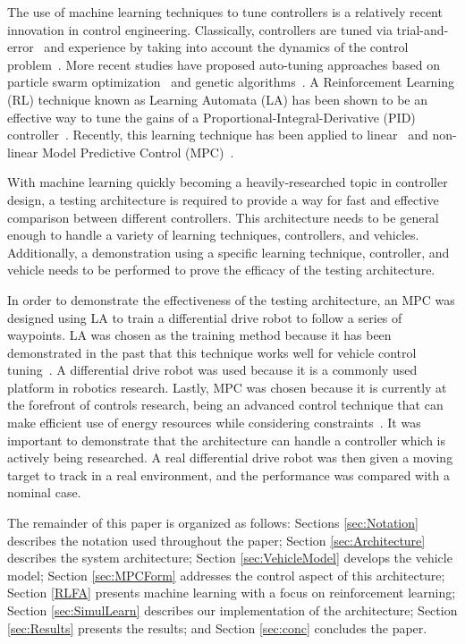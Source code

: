 \documentclass[conference]{IEEEtran}
\begin{document}
The use of machine learning techniques to tune controllers is a relatively recent innovation in control engineering. Classically, controllers are tuned via trial-and-error~\cite{Suicmez-2014} and experience by taking into account the dynamics of the control problem~\cite{Camacho:1999}. More recent studies have proposed auto-tuning approaches based on particle swarm optimization~\cite{han:2006,suzuki:2007} and genetic algorithms~\cite{vanderlee:2008}. A Reinforcement Learning (RL) technique known as Learning Automata (LA) has been shown to be an effective way to tune the gains of a Proportional-Integral-Derivative (PID) controller~\cite{Barros-2015}. Recently, this learning technique has been applied to linear~\cite{JardineSys-2017,jardine:2017:IFAC} and non-linear Model Predictive Control (MPC)~\cite{cabral:2017}. 

With machine learning quickly becoming a heavily-researched topic in controller design, a testing architecture is required to provide a way for fast and effective comparison between different controllers. This architecture needs to be general enough to handle a variety of learning techniques, controllers, and vehicles. Additionally, a demonstration using a specific learning technique, controller, and vehicle needs to be performed to prove the efficacy of the testing architecture. 

In order to demonstrate the effectiveness of the testing architecture, an MPC was designed using LA to train a differential drive robot to follow a series of waypoints. LA was chosen as the training method because it has been demonstrated in the past that this technique works well for vehicle control tuning~\cite{Barros-2015,JardineSys-2017,jardine:2017:IFAC,cabral:2017}. A differential drive robot was used because it is a commonly used platform in robotics research. Lastly, MPC was chosen because it is currently at the forefront of controls research, being an advanced control technique that can make efficient use of energy resources while considering constraints~\cite{Mooryong:2014,Zhao:2015,Ramana-2016}. It was important to demonstrate that the architecture can handle a controller which is actively being researched. A real differential drive robot was then given a moving target to track in a real environment, and the performance was compared with a nominal case.

The remainder of this paper is organized as follows: Sections \ref{sec:Notation} describes the notation used throughout the paper; Section \ref{sec:Architecture} describes the system architecture; Section \ref{sec:VehicleModel} develops the vehicle model; Section \ref{sec:MPCForm} addresses the control aspect of this architecture; Section \ref{RLFA} presents machine learning with a focus on reinforcement learning; Section \ref{sec:SimulLearn} describes our implementation of the architecture; Section \ref{sec:Results} presents the results; and Section \ref{sec:conc} concludes the paper.
\end{document}
